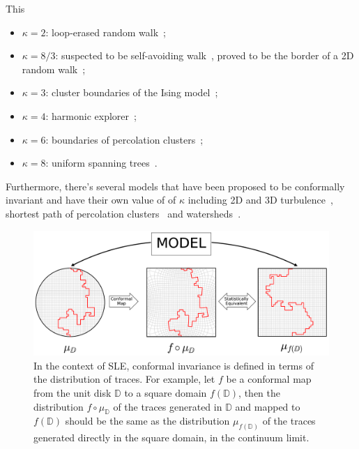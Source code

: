 This
\begin{itemize}
    \item $\kappa=2$: loop-erased random walk~\cite{Schramm2000};
    \item $\kappa=8/3$: suspected to be self-avoiding walk~\cite{Kennedy2002},
        proved to be the border of a 2D random walk~\cite{Lawler2001};
    \item $\kappa=3$: cluster boundaries of the Ising model~\cite{Chelkak2014};
    \item $\kappa=4$: harmonic explorer~\cite{Schramm2005};
    \item $\kappa=6$: boundaries of percolation clusters~\cite{Smirnov2001b};
    \item $\kappa=8$: uniform spanning trees~\cite{Schramm2000}.
\end{itemize}
Furthermore, there's several models that have been proposed to be conformally
invariant and have their own value of of $\kappa$ including 2D and 3D
turbulence~\cite{Bernard2006, Thalabard2011}, shortest path of percolation
clusters~\cite{Pose2014} and watersheds~\cite{Daryaei2012}.

\begin{figure}
\begin{center}
    \includegraphics[width=\textwidth]{chapters/ch4-sle/figs/sle_confinv}
\end{center}
\caption{In the context of SLE, conformal invariance is defined in terms of the
    distribution of traces. For example, let $f$ be a conformal map from the
    unit disk $\mathbb{D}$ to a square domain $f(\mathbb{D})$, then the
    distribution $f\circ\mu_\mathbb{D}$ of the traces generated in $\mathbb{D}$
    and mapped to $f(\mathbb{D})$ should be the same as the distribution
    $\mu_{f(\mathbb{D})}$ of the traces generated directly in the square
    domain, in the continuum limit.}
\label{fig:confinv}
\end{figure}

